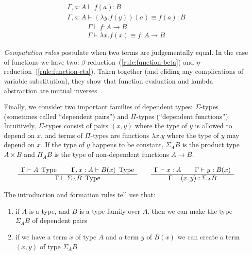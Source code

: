\begin{equation}
  \begin{array}{c}
    \Gamma, a : A \vdash f(a) : B\\
    \hline
    \Gamma, a : A \vdash (\lambda y . f(y))(a) \equiv f(a) : B
  \end{array}
  \label{rule:function-beta}
\end{equation}
\begin{equation}
  \begin{array}{c}
    \Gamma \vdash f : A \rightarrow B\\
    \hline
    \Gamma \vdash \lambda x. f(x) \equiv f : A \rightarrow B
  \end{array}
  \label{rule:function-eta}
\end{equation}

\emph{Computation rules} postulate when two terms are judgementally equal. In
the case of functions we have two: $\beta$-reduction~(\ref{rule:function-beta})
and $\eta$-reduction~(\ref{rule:function-eta}). Taken together (and eliding any
complications of variable substitution), they show that
function evaluation and lambda abstraction are mutual inverses~\cite{Rijke2019}.

Finally, we consider two important families of dependent types: $\Sigma$-types
(sometimes called ``dependent pairs'') and $\Pi$-types (``dependent
functions''). Intuitively, $\Sigma$-types consist of pairs $(x,y)$ where the
type of $y$ is allowed to depend on $x$, and terms of $\Pi$-types are functions
$\lambda x . y$ where the type of $y$ may depend on $x$. If the type of $y$
happens to be constant, $\Sigma_A B$ is the product type $A \times B$ and
$\Pi_A B$ is the type of non-dependent functions $A \rightarrow B$.

\begin{equation*}
  \begin{array}[t]{c}
    \Gamma \vdash A \; \operatorname{Type} \qquad \Gamma, x:A \vdash B(x) \; \operatorname{Type}\\
    \hline
    \Gamma \vdash \Sigma_A B \; \operatorname{Type}\\
  \end{array}
  \qquad
  \begin{array}[t]{c}
    \Gamma \vdash x:A \qquad \Gamma \vdash y : B(x)\\
    \hline
    \Gamma \vdash (x , y) : \Sigma_A B
  \end{array}
\end{equation*}

The introduction and formation rules tell use that: 
\begin{enumerate}
\item if $A$ is a type, and $B$ is a type family over $A$,
  then we can make the type $\Sigma_A B$ of dependent pairs
\item if we have a term $x$ of type $A$ and a term $y$ of $B(x)$ we can create
    a term $(x,y)$ of type $\Sigma_A B$
\end{enumerate}

